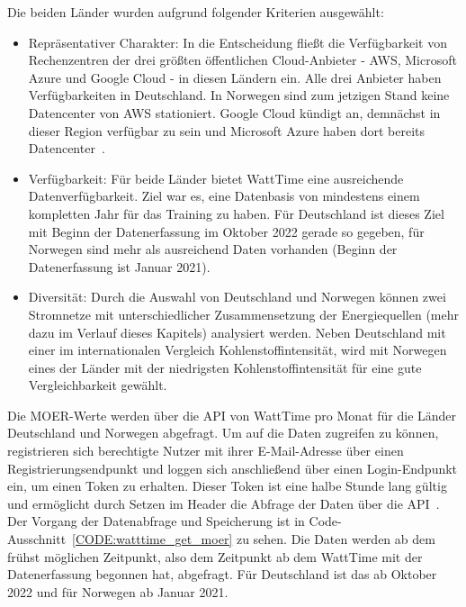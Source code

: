 Die beiden Länder wurden aufgrund folgender Kriterien ausgewählt:
\begin{itemize}
 \item Repräsentativer Charakter: In die Entscheidung fließt die Verfügbarkeit von Rechenzentren der drei größten öffentlichen Cloud-Anbieter - \ac{AWS}, Microsoft Azure und Google Cloud - in diesen Ländern ein.
 Alle drei Anbieter haben Verfügbarkeiten in Deutschland.
 In Norwegen sind zum jetzigen Stand keine Datencenter von \ac{AWS} stationiert.
 Google Cloud kündigt an, demnächst in dieser Region verfügbar zu sein und Microsoft Azure haben dort bereits Datencenter~\cite{AmazonWebServices.20240318T18:30:19.000Z}\cite{GoogleCloud.20240311T07:04:17.000Z}\cite{Microsoft.20240307T01:34:37.000Z}.
 \item Verfügbarkeit: Für beide Länder bietet WattTime eine ausreichende Datenverfügbarkeit.
 Ziel war es, eine Datenbasis von mindestens einem kompletten Jahr für das Training zu haben.
 Für Deutschland ist dieses Ziel mit Beginn der Datenerfassung im Oktober 2022 gerade so gegeben, für Norwegen sind mehr als ausreichend Daten vorhanden (Beginn der Datenerfassung ist Januar 2021).
 \item Diversität: Durch die Auswahl von Deutschland und Norwegen können zwei Stromnetze mit unterschiedlicher Zusammensetzung der Energiequellen (mehr dazu im Verlauf dieses Kapitels) analysiert werden.
 Neben Deutschland mit einer im internationalen Vergleich Kohlenstoffintensität, wird mit Norwegen eines der Länder mit der niedrigsten Kohlenstoffintensität für eine gute Vergleichbarkeit gewählt.
\end{itemize}
Die \ac{MOER}-Werte werden über die \ac{API} von WattTime pro Monat für die Länder Deutschland und Norwegen abgefragt.
Um auf die Daten zugreifen zu können, registrieren sich berechtigte Nutzer mit ihrer E-Mail-Adresse über einen Registrierungsendpunkt und loggen sich anschließend über einen Login-Endpunkt ein, um einen Token zu erhalten.
Dieser Token ist eine halbe Stunde lang gültig und ermöglicht durch Setzen im Header die Abfrage der Daten über die \ac{API}~\cite{.20240220T17:59:19.000Z}.
Der Vorgang der Datenabfrage und Speicherung ist in Code-Ausschnitt~\ref{CODE:watttime_get_moer} zu sehen.
Die Daten werden ab dem frühst möglichen Zeitpunkt, also dem Zeitpunkt ab dem WattTime mit der Datenerfassung begonnen hat, abgefragt.
Für Deutschland ist das ab Oktober 2022 und für Norwegen ab Januar 2021.

